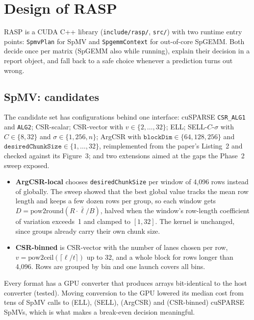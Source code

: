 \section{Design of RASP}\label{sec:design}

RASP is a CUDA C++ library (\texttt{include/rasp/}, \texttt{src/}) with two runtime entry points: \texttt{SpmvPlan}
for SpMV and \texttt{SpgemmContext} for out-of-core SpGEMM. Both decide once per matrix (SpGEMM also while running),
explain their decision in a report object, and fall back to a safe choice whenever a prediction turns out wrong.

\subsection{SpMV: candidates}\label{sec:design-spmv}
The candidate set has  configurations behind one interface: cuSPARSE \texttt{CSR\_ALG1} and
\texttt{ALG2}; CSR-scalar; CSR-vector with $v \in \{2,\dots,32\}$; ELL; SELL-$C$-$\sigma$ with $C\in\{8,32\}$ and
$\sigma \in \{1, 256, n\}$; ArgCSR with $\mathtt{blockDim} \in \{64,128,256\}$ and
$\mathtt{desiredChunkSize} \in \{1,\dots,32\}$, reimplemented from the paper's Listing~2 and checked against its
Figure~3; and two extensions aimed at the gaps the Phase~2 sweep exposed.
\begin{itemize}
\item \textbf{ArgCSR-local} chooses \texttt{desiredChunkSize} per window of 4,096 rows instead of globally. The sweep
  showed that the best global value tracks the mean row length and keeps a few dozen rows per group, so each window
  gets $D = \mathrm{pow2round}(R\cdot\bar{\ell}/B)$, halved when the window's row-length coefficient of variation
  exceeds~1 and clamped to $[1, 32]$. The kernel is unchanged, since groups already carry their own chunk size.
\item \textbf{CSR-binned} is CSR-vector with the number of lanes chosen per row,
  $v = \mathrm{pow2ceil}(\lceil \ell/t \rceil)$ up to 32, and a whole block for rows longer than 4,096. Rows are grouped
  by bin and one launch covers all bins.
\end{itemize}
Every format has a GPU converter that produces arrays bit-identical to the host converter (tested). Moving
conversion to the GPU lowered its median cost from tens of SpMV calls to  (ELL),
 (SELL),  (ArgCSR) and
 (CSR-binned) cuSPARSE SpMVs, which is what makes a break-even decision meaningful.

